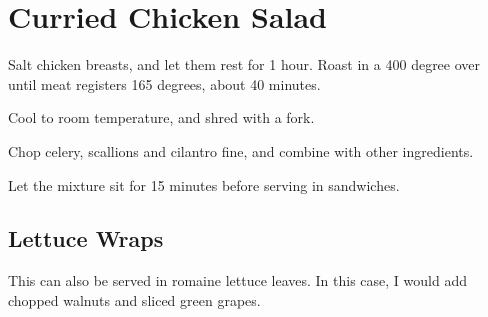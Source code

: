 

\section{Curried Chicken Salad}
\begin{recipe}



Salt chicken breasts, and let them rest for 1 hour. Roast in a 400 degree over until meat registers 165 degrees, about 40 minutes.

Cool to room temperature, and shred with a fork.


Chop celery, scallions and cilantro fine, and combine with other ingredients.

Let the mixture sit for 15 minutes before serving in sandwiches.

\subsection{Lettuce Wraps}

This can also be served in romaine lettuce leaves. In this case, I would  add chopped walnuts and sliced green grapes.

\end{recipe}
